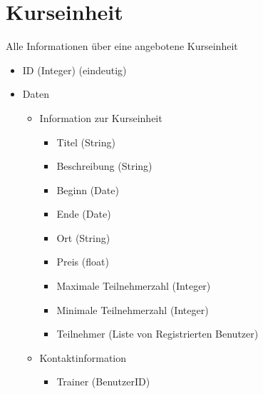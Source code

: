 \documentclass[a4paper]{scrreprt}
\newcounter{Lc}
\newcounter{Hc}
\newcommand{\stepHc}{\stepcounter{Hc}\setcounter{Lc}{0}}
\begin{document}
\section{Kurseinheit}
\Func {} Alle Informationen über eine angebotene Kurseinheit
\begin{itemize}
	\item ID (Integer) (eindeutig)
	\item Daten
	\begin{itemize}
		\item Information zur Kurseinheit
		\begin{itemize}
			\item Titel (String)
			\item Beschreibung (String)
			\item Beginn (Date)
			\item Ende (Date)
			\item Ort (String)
			\item Preis (\gls{float})
			\item Maximale Teilnehmerzahl (Integer)
			\item Minimale Teilnehmerzahl (Integer)
			\item Teilnehmer (Liste von Registrierten Benutzer) 
		\end{itemize}
		\item Kontaktinformation
		\begin{itemize}
			\item Trainer (BenutzerID)
		\end{itemize}
	\end{itemize}
	
	
	
\end{itemize}   


\stepHc	   		
\end{document}
